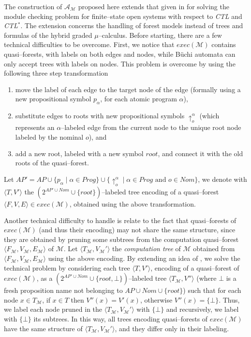 \documentclass{LMCS}
\theoremstyle{plain}
\def \A             {\mathcal{A}}
\def \CTL           {\emph{CTL}\xspace}
\def \CTLSTAR       {\emph{CTL$^*$}\xspace}
\def \edge          {E}
\def \M             {\mathcal{M}}
\def \node          {V}
\def \rr            {\mathit{root}}
\newcommand \tpl[1] {\langle #1 \rangle}
\begin{document}
The construction of $\A_{\M}$ proposed here extends that given in
\cite{KVW01} for solving the module checking problem for
finite--state open systems with respect to \CTL and \CTLSTAR. The
extension concerns the handling of forest models instead of trees
and formulas of the hybrid graded $\mu$--calculus. Before
starting, there are a few technical difficulties to be overcome.
First, we notice that $exec(\M)$ contains quasi--forests, with
labels on both edges and nodes, while B\"{u}chi automata can only
accept trees with labels on nodes. This problem is overcome by
using the following three step transformation
\begin{enumerate}[(1)]
\item
move the label of each edge to the target node of the edge (formally using a
new propositional symbol $p_{\alpha}$, for each atomic program $\alpha$),

\item
substitute edges to roots with new propositional symbols $\uparrow_o^{\alpha}$
(which represents an $\alpha$--labeled edge from the current node to the unique
root node labeled by the nominal $o$), and

\item
add a new root, labeled with a new symbol $\rr$, and connect it with the old roots of the quasi--forest.
\end{enumerate}

Let $AP'= AP \cup \{p_{\alpha} \mid \alpha \in Prog\} \cup
\{\uparrow_o^{\alpha} \mid \alpha \in Prog \text{ and } o \in Nom\}$, we denote
with $\tpl{T,\node'}$ the $(2^{AP' \cup Nom} \cup \{\rr\})$--labeled tree
encoding of a quasi--forest $\tpl{F,\node,\edge} \in exec(\M)$, obtained using
the above transformation.

Another technical difficulty to handle is relate to the fact that
quasi--forests of $exec(\M)$ (and thus their encoding) may not share the same
structure, since they are obtained by pruning some subtrees from the
computation quasi--forest $\tpl{F_{\M}, \node_{\M}, \edge_{\M}}$ of $\M$. Let
$\tpl{T_{\M}, \node_{\M}'}$ the \emph{computation tree} of $\M$ obtained from
$\tpl{F_{\M}, \node_{\M}, \edge_{\M}}$ using the above encoding. By extending
an idea of \cite{KVW01}, we solve the technical problem by considering each
tree $\tpl{T,\node'}$, encoding of a quasi--forest of $exec(\M)$, as a
$(2^{AP'\cup Nom} \cup \{\rr,\bot\})$--labeled tree $\tpl{T_{\M}, \node''}$
(where $\bot$ is a fresh proposition name not belonging to $AP \cup Nom \cup
\{\rr\}$) such that for each node $x \in T_{\M}$, if $x \in T$ then $\node''(x)
= \node'(x)$, otherwise $\node''(x) = \{\bot\}$. Thus, we label each node
pruned in the $\tpl{T_{\M},\node_{\M}'}$ with $\{\bot\}$ and recursively, we
label with $\{\bot\}$ its subtrees. In this way, all trees encoding
quasi--forests of $exec(\M)$ have the same structure of
$\tpl{T_{\M},\node_{\M}'}$, and they differ only in their labeling.
\end{document}

